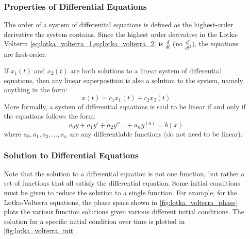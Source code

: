 \subsubsection{Properties of Differential Equations}
\label{subsubsection:properties_differential}
\begin{definition}
    The order of a system of differential equations is defined as the highest-order derivative the system contains. Since the highest order derivative in the Lotka-Volterra \cref{eq:lotka_volterra_1,eq:lotka_volterra_2} is $\frac{d}{dt}$ (no $\frac{d^2}{{dt}^2}$), the equations are first-order.
\end{definition}

\begin{definition}
    If \(x_1(t)\) and \(x_2(t)\) are both solutions to a linear system of differential equations, then any linear superposition is also a solution to the system, namely anything in the form:
    \begin{equation}
        x(t) = c_1 x_1(t) + c_2 x_2(t) 
    \end{equation}
    More formally, a system of differential equations is said to be linear if and only if the equations follows the form:
    \begin{equation}
        a_0 y + a_1 y' + a_2 y'' \dots + a_n y^{(n)} = b(x)
    \end{equation}
    \noindent
    where $a_0, a_1, a_2, ..., a_n$ are any differentiable functions (do not need to be linear).
\end{definition}

\subsubsection{Solution to Differential Equations}
Note that the solution to a differential equation is not one function, but rather a set of functions that all satisfy the differential equation. Some initial conditions must be given to reduce the solution to a single function. For example, for the Lotka-Volterra equations, the phase space shown in \cref{fig:lotka_volterra_phase} plots the various function solutions given various different initial conditions. The solution for a specific initial condition over time is plotted in \cref{fig:lotka_volterra_init}.

